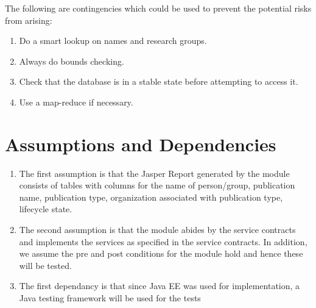 	The following are contingencies which could be used to prevent the potential risks from arising:
\begin{enumerate}

	\item Do a smart lookup on names and research groups.
	\item Always do bounds checking.
	\item Check that the database is in a stable state before attempting to access it.
	\item Use a map-reduce if necessary.
         

\end{enumerate}


\section{Assumptions and Dependencies}

\begin{enumerate}
	\item The first assumption is that the Jasper Report generated by the module consists of tables with columns for the name of person/group, publication name, publication type, organization associated with publication type, lifecycle state.
	\item The second assumption is that the module abides by the service contracts and implements the services as specified in the service contracts. In addition, we assume the pre and post conditions for the module hold and hence these will be tested.
	\item The first dependancy is that since Java EE was used for implementation, a Java testing framework will be used for the tests
\end{enumerate}